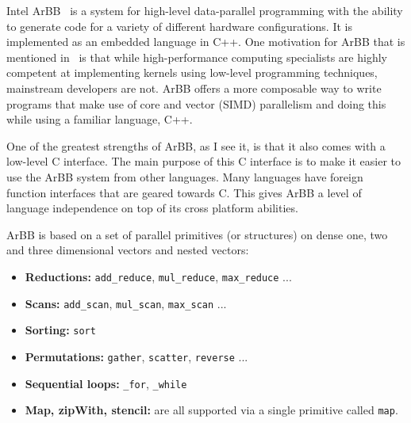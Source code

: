 \documentclass[a4paper]{book}
\begin{document}
Intel ArBB~\citet{ARBB2011} is a system for high-level data-parallel programming with the 
ability to generate code for a variety of different hardware configurations. It is implemented 
as an embedded language in C++. One motivation for ArBB that is mentioned in~\citet{ARBB2011} is 
that while high-performance computing specialists are highly competent at implementing 
kernels using low-level programming techniques, mainstream developers are not. ArBB offers 
a more composable way to write programs that make use of core and vector (SIMD) parallelism and 
doing this while using a familiar language, C++.  

One of the greatest strengths of ArBB, as I see it, is that it also comes with a low-level C 
interface. The main purpose of this C interface is to make it easier to use the ArBB system 
from other languages. Many languages have foreign function interfaces that are geared towards C.
This gives ArBB a level of language independence on top of its cross platform abilities.  


ArBB is based on a set of parallel primitives (or structures) on dense one, two and three dimensional vectors and nested vectors: 
\begin{small}
\begin{itemize} 
\item {\bf Reductions:}   {\tt add\_reduce}, {\tt mul\_reduce}, {\tt max\_reduce} ... 
\item {\bf Scans:}        {\tt add\_scan}, {\tt mul\_scan}, {\tt max\_scan} ... 
\item {\bf Sorting:}      {\tt sort} 
\item {\bf Permutations:} {\tt gather}, {\tt scatter}, {\tt reverse} ...
\item {\bf Sequential loops:} {\tt \_for}, {\tt \_while} 
\item {\bf Map, zipWith, stencil:} are all supported via a single primitive called {\tt map}.
\end{itemize}
\end{small}
\end{document}

